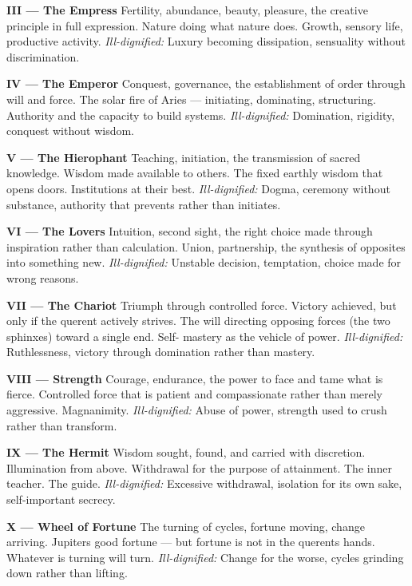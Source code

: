 \textbf{III --- The Empress} Fertility, abundance, beauty, pleasure, the creative principle in full expression. Nature doing what nature does. Growth, sensory life, productive activity. \emph{Ill-dignified:} Luxury becoming dissipation, sensuality without discrimination.

\textbf{IV --- The Emperor} Conquest, governance, the establishment of order through will and force. The solar fire of Aries --- initiating, dominating, structuring. Authority and the capacity to build systems. \emph{Ill-dignified:} Domination, rigidity, conquest without wisdom.

\textbf{V --- The Hierophant} Teaching, initiation, the transmission of sacred knowledge. Wisdom made available to others. The fixed earthly wisdom that opens doors. Institutions at their best. \emph{Ill-dignified:} Dogma, ceremony without substance, authority that prevents rather than initiates.

\textbf{VI --- The Lovers} Intuition, second sight, the right choice made through inspiration rather than calculation. Union, partnership, the synthesis of opposites into something new. \emph{Ill-dignified:} Unstable decision, temptation, choice made for wrong reasons.

\textbf{VII --- The Chariot} Triumph through controlled force. Victory achieved, but only if the querent actively strives. The will directing opposing forces (the two sphinxes) toward a single end. Self- mastery as the vehicle of power. \emph{Ill-dignified:} Ruthlessness, victory through domination rather than mastery.

\textbf{VIII --- Strength} Courage, endurance, the power to face and tame what is fierce. Controlled force that is patient and compassionate rather than merely aggressive. Magnanimity. \emph{Ill-dignified:} Abuse of power, strength used to crush rather than transform.

\textbf{IX --- The Hermit} Wisdom sought, found, and carried with discretion. Illumination from above. Withdrawal for the purpose of attainment. The inner teacher. The guide. \emph{Ill-dignified:} Excessive withdrawal, isolation for its own sake, self-important secrecy.

\textbf{X --- Wheel of Fortune} The turning of cycles, fortune moving, change arriving. Jupiter\textquotesingle s good fortune --- but fortune is not in the querent\textquotesingle s hands. Whatever is turning will turn. \emph{Ill-dignified:} Change for the worse, cycles grinding down rather than lifting.

